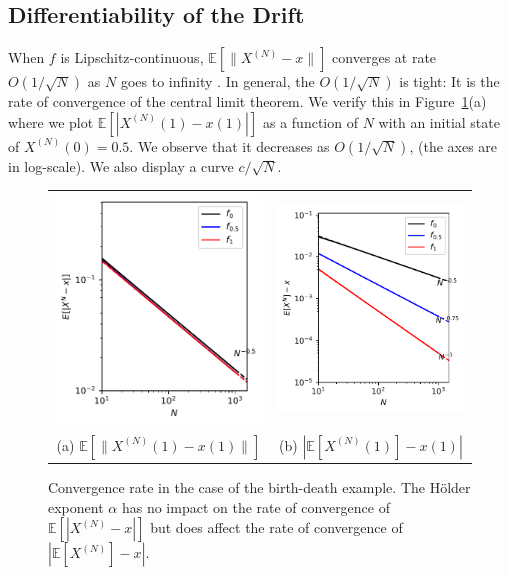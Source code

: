\documentclass[acmlarge]{acmart}
\newcommand\XN{X^{(N)}}
\newcommand\sesp[1]{\mathbb{E}[#1]}
\newcommand\snorm[1]{\|#1\|}
\begin{document}
\subsection{Differentiability of the Drift}
\label{sec:BD}

When $f$ is Lipschitz-continuous, $\sesp{\snorm{\XN-x}}$ converges at
rate $O(1/\sqrt{N})$ as $N$ goes to infinity
\cite{benaim2008class,kurtz70}. In general, the $O(1/\sqrt{N})$ is
tight: It is the rate of convergence of the central limit theorem. We
verify this in Figure~\ref{fig:rate_fL-f2}(a) where we plot
$\sesp{|\XN(1)-x(1)|}$ as a function of $N$ with an initial state of
$\XN(0)=0.5$. We observe that it decreases as $O(1/\sqrt{N})$, (the
axes are in log-scale). We also display a curve $c/\sqrt{N}$.

\begin{figure}[ht]
  \centering
  \begin{tabular}{@{}c@{}c@{}}
    \includegraphics[width=.5\linewidth]{rate_birthRate_norm2}
    &\includegraphics[width=.5\linewidth]{rate_birthRate}\\
    (a) $\sesp{\snorm{\XN(1)-x(1)}}$ & (b) $|\sesp{\XN(1)}-x(1)|$
  \end{tabular}
  \caption{Convergence rate in the case of the birth-death
    example. The Hölder exponent $\alpha$ has no impact on the rate of
    convergence of $\sesp{|\XN-x|}$ but does affect the rate of
    convergence of $|\sesp{\XN}-x|$.}
  \label{fig:rate_fL-f2}
\end{figure}
\end{document}

